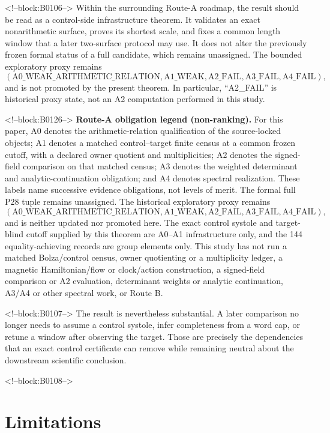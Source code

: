 \documentclass[11pt,a4paper]{article}
\theoremstyle{definition}
\begin{document}
<!--block:B0106-->
Within the surrounding Route-A roadmap, the result should be read as a
control-side infrastructure theorem.  It validates an exact nonarithmetic
surface, proves its shortest scale, and fixes a common length window that a
later two-surface protocol may use.  It does not alter the previously frozen
formal status of a full candidate, which remains unassigned.  The bounded
exploratory proxy remains
\[
 (\mathrm{A0\_WEAK\_ARITHMETIC\_RELATION},
  \mathrm{A1\_WEAK},
  \mathrm{A2\_FAIL},
  \mathrm{A3\_FAIL},
  \mathrm{A4\_FAIL}),
\]
and is not promoted by the present theorem.  In particular, ``A2\_FAIL'' is
historical proxy state, not an A2 computation performed in this study.

<!--block:B0126-->
\noindent\textbf{Route-A obligation legend (non-ranking).}
For this paper, A0 denotes the arithmetic-relation qualification of the
source-locked objects; A1 denotes a matched control--target finite census at a
common frozen cutoff, with a declared owner quotient and multiplicities; A2
denotes the signed-field comparison on that matched census; A3 denotes the
weighted determinant and analytic-continuation obligation; and A4 denotes
spectral realization.  These labels name successive evidence obligations,
not levels of merit.  The formal full P28 tuple remains unassigned.  The
historical exploratory proxy remains
\[
 (\mathrm{A0\_WEAK\_ARITHMETIC\_RELATION},
  \mathrm{A1\_WEAK},
  \mathrm{A2\_FAIL},
  \mathrm{A3\_FAIL},
  \mathrm{A4\_FAIL}),
\]
and is neither updated nor promoted here.  The exact control systole and
target-blind cutoff supplied by this theorem are A0--A1 infrastructure only,
and the 144 equality-achieving records are group elements only.  This study
has not run a matched Bolza/control census, owner quotienting or a
multiplicity ledger, a magnetic Hamiltonian/flow or clock/action
construction, a signed-field comparison or A2 evaluation, determinant
weights or analytic continuation, A3/A4 or other spectral work, or Route B.

<!--block:B0107-->
The result is nevertheless substantial.  A later comparison no longer needs
to assume a control systole, infer completeness from a word cap, or retune a
window after observing the target.  Those are precisely the dependencies that
an exact control certificate can remove while remaining neutral about the
downstream scientific conclusion.

<!--block:B0108-->
\section{Limitations}
\end{document}
